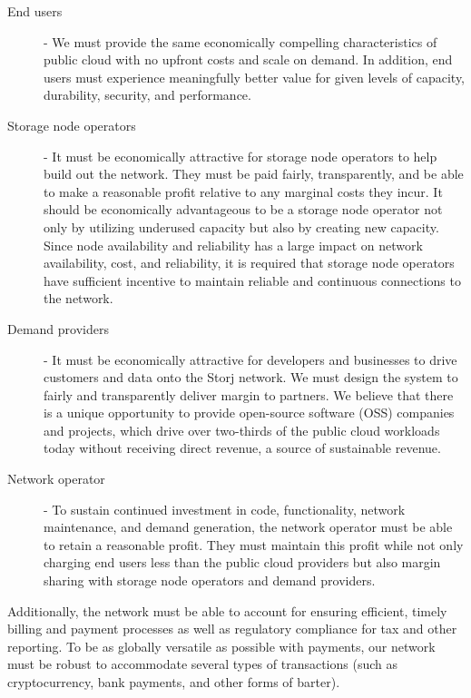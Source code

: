 \documentclass[11pt,fleqn,openany]{book}
\begin{document}
\begin{description}
\item[End users] - We must provide the same economically compelling
  characteristics of public cloud with no upfront costs and scale on demand.
  In addition, end users must experience meaningfully better value for given
  levels of capacity, durability, security, and performance.

\item[Storage node operators] - It must be economically attractive for storage
  node operators to help build out the network.
  They must be paid fairly, transparently, and be able to make a
  reasonable profit relative to any marginal costs they incur.
  It should be economically advantageous to be a storage
  node operator not only by utilizing underused capacity but also by creating new capacity.
  Since node availability and reliability has a large impact on network
  availability, cost, and reliability, it is required that storage node
  operators have sufficient incentive to maintain reliable and continuous
  connections to the network.

\item[Demand providers] - It must be economically attractive for developers and
  businesses to drive customers and data onto the Storj network. We must design
  the system to fairly and transparently deliver margin to partners. We believe
  that there is a unique opportunity to provide open-source software (OSS)
  companies and projects, which drive over two-thirds of the public cloud workloads
  today without receiving direct revenue, a source of sustainable revenue.

\item[Network operator] - To sustain continued investment in code,
functionality, network maintenance, and demand generation, the network
operator must be able to retain a reasonable profit. They must maintain this profit while
not only charging end users less than the public cloud providers but also margin sharing
with storage node operators and demand providers.
\end{description}

Additionally, the network must be able to account for ensuring efficient, timely billing
and payment processes as well as regulatory compliance for tax and other reporting.
To be as globally versatile as possible with payments, our network must be robust to accommodate several types of transactions (such as cryptocurrency, bank payments, and other forms of barter).
\end{document}
